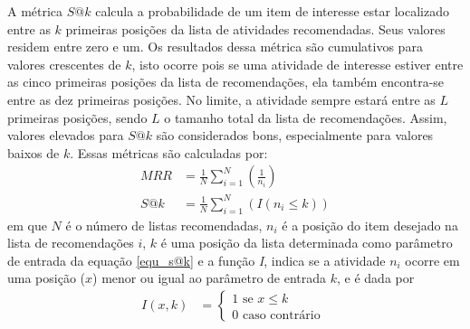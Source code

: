 \documentclass[10pt,letterpaper]{article}
\begin{document}
A métrica \(S@k\) calcula a probabilidade de um item de interesse estar localizado entre as \(k\) primeiras posições da lista de atividades recomendadas. Seus valores residem entre zero e um. Os resultados dessa métrica são cumulativos para valores crescentes de \(k\), isto ocorre pois se uma atividade de interesse estiver entre as cinco primeiras posições da lista de recomendações, ela também encontra-se entre as dez primeiras posições. No limite, a atividade sempre estará entre as \(L\) primeiras posições, sendo \(L\) o tamanho total da lista de recomendações. Assim, valores elevados para $S@k$ são considerados bons, especialmente para valores baixos de $k$. Essas métricas são calculadas por:
\begin{align}
MRR &= \frac{1}{N} \sum\limits_{i=1}^{N} \left( \frac{1}{n_{i}} \right) 		\label{equ_mrr}\\
S@k &= \frac{1}{N} \sum\limits_{i=1}^{N} \left( I(n_{i} \leq k) \right)			\label{equ_s@k}
\end{align}
em que \(N\) é o número de listas recomendadas, \(n_{i}\) é a posição do item desejado na lista de recomendações \(i\), \(k\) é uma posição da lista determinada como parâmetro de entrada da equação \eqref{equ_s@k} e a função \emph{I}, indica se a atividade \(n_{i}\) ocorre em uma posição (\(x\)) menor ou igual ao parâmetro de entrada \(k\), e é dada por
\begin{align}
I(x, k)   &= \begin{cases} \label{equ_indicativa}
1 \textrm{ se } x \leq k \\
0 \textrm{ caso contrário }
\end{cases}
\end{align}


\end{document}
